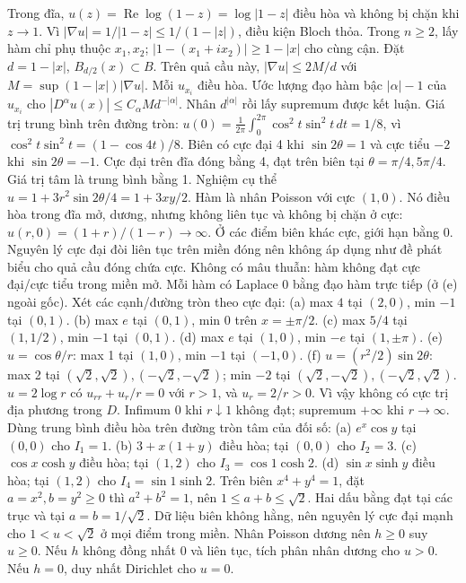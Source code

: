 Trong đĩa, $u(z)=\operatorname{Re}\log(1-z)=\log|1-z|$ điều hòa và không bị chặn khi $z\to1$. Vì $|\nabla u|=1/|1-z|\le1/(1-|z|)$, điều kiện Bloch thỏa. Trong $n\ge2$, lấy hàm chỉ phụ thuộc $x_1,x_2$; $|1-(x_1+ix_2)|\ge1-|x|$ cho cùng cận.
Đặt $d=1-|x|$, $B_{d/2}(x)\subset B$. Trên quả cầu này, $|\nabla u|\le2M/d$ với $M=\sup(1-|x|)|\nabla u|$. Mỗi $u_{x_i}$ điều hòa. Ước lượng đạo hàm bậc $|\alpha|-1$ của $u_{x_i}$ cho $|D^\alpha u(x)|\le C_\alpha M d^{-|\alpha|}$. Nhân $d^{|\alpha|}$ rồi lấy supremum được kết luận.
Giá trị trung bình trên đường tròn: $u(0)=\frac1{2\pi}\int_0^{2\pi}\cos^2t\sin^2t\,dt=1/8$, vì $\cos^2t\sin^2t=(1-\cos4t)/8$.
Biên có cực đại 4 khi $\sin2\theta=1$ và cực tiểu $-2$ khi $\sin2\theta=-1$. Cực đại trên đĩa đóng bằng 4, đạt trên biên tại $\theta=\pi/4,5\pi/4$. Giá trị tâm là trung bình bằng 1. Nghiệm cụ thể $u=1+3r^2\sin2\theta/4=1+3xy/2$.
Hàm là nhân Poisson với cực $(1,0)$. Nó điều hòa trong đĩa mở, dương, nhưng không liên tục và không bị chặn ở cực: $u(r,0)=(1+r)/(1-r)\to\infty$. Ở các điểm biên khác cực, giới hạn bằng 0. Nguyên lý cực đại đòi liên tục trên miền đóng nên không áp dụng như đề phát biểu cho quả cầu đóng chứa cực. Không có mâu thuẫn: hàm không đạt cực đại/cực tiểu trong miền mở.
Mỗi hàm có Laplace 0 bằng đạo hàm trực tiếp (ở (e) ngoài gốc). Xét các cạnh/đường tròn theo cực đại:
(a) max $4$ tại $(2,0)$, min $-1$ tại $(0,1)$.
(b) max $e$ tại $(0,1)$, min 0 trên $x=\pm\pi/2$.
(c) max $5/4$ tại $(1,1/2)$, min $-1$ tại $(0,1)$.
(d) max $e$ tại $(1,0)$, min $-e$ tại $(1,\pm\pi)$.
(e) $u=\cos\theta/r$: max 1 tại $(1,0)$, min $-1$ tại $(-1,0)$.
(f) $u=(r^2/2)\sin2\theta$: max 2 tại $(\sqrt2,\sqrt2),(-\sqrt2,-\sqrt2)$; min $-2$ tại $(\sqrt2,-\sqrt2),(-\sqrt2,\sqrt2)$.
$u=2\log r$ có $u_{rr}+u_r/r=0$ với $r>1$, và $u_r=2/r>0$. Vì vậy không có cực trị địa phương trong $D$. Infimum 0 khi $r\downarrow1$ không đạt; supremum $+\infty$ khi $r\to\infty$.
Dùng trung bình điều hòa trên đường tròn tâm của đối số:
(a) $e^x\cos y$ tại $(0,0)$ cho $I_1=1$.
(b) $3+x(1+y)$ điều hòa; tại $(0,0)$ cho $I_2=3$.
(c) $\cos x\cosh y$ điều hòa; tại $(1,2)$ cho $I_3=\cos1\cosh2$.
(d) $\sin x\sinh y$ điều hòa; tại $(1,2)$ cho $I_4=\sin1\sinh2$.
Trên biên $x^4+y^4=1$, đặt $a=x^2,b=y^2\ge0$ thì $a^2+b^2=1$, nên $1\le a+b\le\sqrt2$. Hai dấu bằng đạt tại các trục và tại $a=b=1/\sqrt2$. Dữ liệu biên không hằng, nên nguyên lý cực đại mạnh cho $1<u<\sqrt2$ ở mọi điểm trong miền.
Nhân Poisson dương nên $h\ge0$ suy $u\ge0$. Nếu $h$ không đồng nhất 0 và liên tục, tích phân nhân dương cho $u>0$. Nếu $h=0$, duy nhất Dirichlet cho $u=0$.
